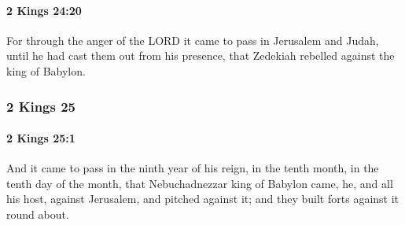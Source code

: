 		\paragraph{2 Kings 24:20} %
			\label{2KINGS-24-20}

			For through the anger of the LORD it came to pass in Jerusalem and Judah, until he had cast them out from his presence, that Zedekiah rebelled against the king of Babylon.

	\subsubsection{2 Kings 25} %
		\label{2KINGS-25}

		\paragraph{2 Kings 25:1} %
			\label{2KINGS-25-1}

			And it came to pass in the ninth year of his reign, in the tenth month, in the tenth day of the month, that Nebuchadnezzar king of Babylon came, he, and all his host, against Jerusalem, and pitched against it; and they built forts against it round about.

